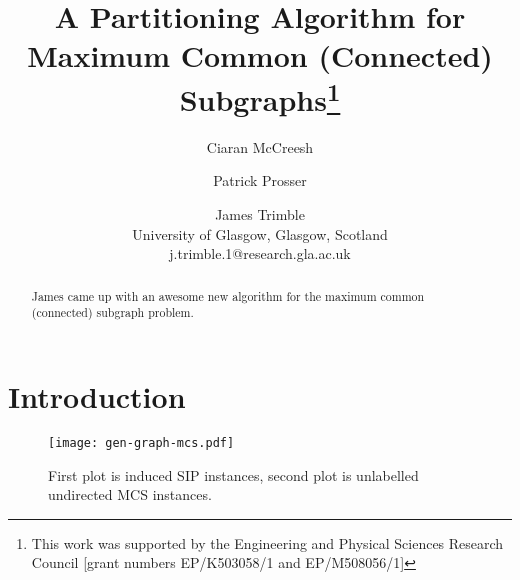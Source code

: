\documentclass[letterpaper]{article}
\title{A Partitioning Algorithm for Maximum Common (Connected) Subgraphs\thanks{This work
was supported by the Engineering and Physical Sciences Research Council [grant
numbers EP/K503058/1 and EP/M508056/1]}}
\author{Ciaran McCreesh \and Patrick Prosser \and James Trimble \\
University of Glasgow, Glasgow, Scotland \\
j.trimble.1@research.gla.ac.uk}
\begin{document}
\maketitle

\begin{abstract}
    James came up with an awesome new algorithm for the maximum common (connected)
    subgraph problem.
\end{abstract}

\section{Introduction}

\begin{figure*}[tb]
    \centering
    \texttt{[image: gen-graph-mcs.pdf]}
    \caption{First plot is induced SIP instances, second plot is unlabelled
    undirected MCS instances.}\label{figure:runtimes}
\end{figure*}



\end{document}
